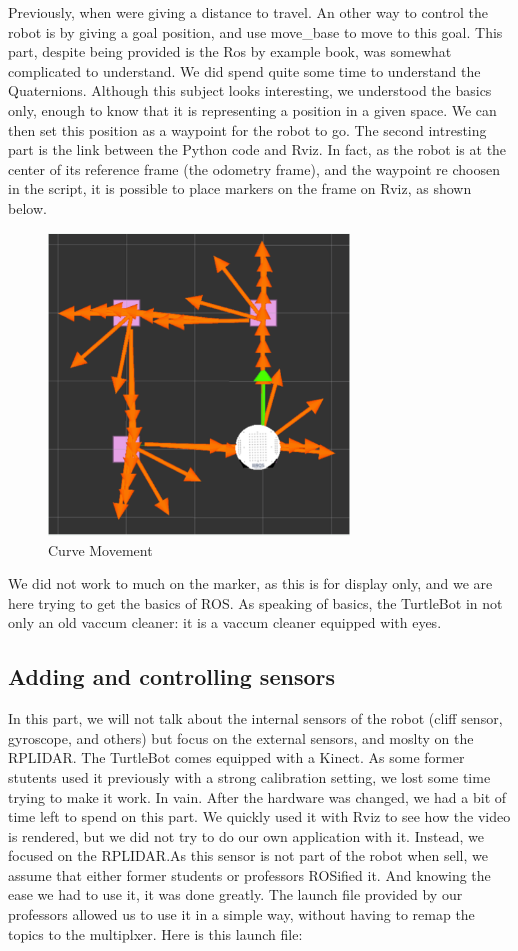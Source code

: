 \documentclass[aps,letterpaper,11pt]{revtex4}
\begin{document}
Previously, when were giving a distance to travel. An other way to control the robot is by giving a goal position, and use move\_base to move to this goal. This part, despite being provided is the Ros by example book, was somewhat complicated to understand. We did spend quite some time to understand the Quaternions. Although this subject looks interesting, we understood the basics only, enough to know that it is representing a position in a given space. We can then set this position as a waypoint for the robot to go. The second intresting part is the link between the Python code and Rviz. In fact, as the robot is at the center of its reference frame (the odometry frame), and the waypoint re choosen in the script, it is possible to place markers on the frame on Rviz, as shown below.

\begin{figure}[H]
	\centering
	\includegraphics[width=8cm]{markers.png}
	\caption{Curve Movement}
	\label{fig: Markers}    
\end{figure} 

We did not work to much on the marker, as this is for display only, and we are here trying to get the basics of ROS. As speaking of basics, the TurtleBot in not only an old vaccum cleaner: it is a vaccum cleaner equipped with eyes.

\subsection{Adding and controlling sensors}
In this part, we will not talk about the internal sensors of the robot (cliff sensor, gyroscope, and others) but focus on the external sensors, and moslty on the RPLIDAR.
The TurtleBot comes equipped with a Kinect. As some former stutents used it previously with a strong calibration setting, we lost some time trying to make it work. In vain. After the hardware was changed, we had a bit of time left to spend on this part. We quickly used it with Rviz to see how the video is rendered, but we did not try to do our own application with it.
Instead, we focused on the RPLIDAR.As this sensor is not part of the robot when sell, we assume that either former students or professors ROSified it. And knowing the ease we had to use it, it was done greatly. The launch file provided by our professors allowed us to use it in a simple way, without having to remap the topics to the multiplxer. Here is this launch file: 
\end{document}
